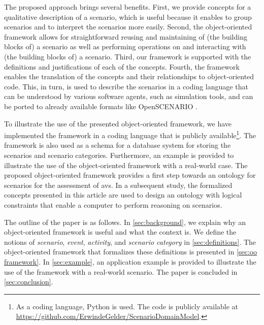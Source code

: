 The proposed approach brings several benefits.
First, we provide concepts for a qualitative description of a scenario, which is useful because it enables to group scenarios and to interpret the scenarios more easily. 
Second, the object-oriented framework allows for straightforward reusing and maintaining of (the building blocks of) a scenario as well as performing operations on and interacting with (the building blocks of) a scenario.
Third, our framework is supported with the definitions and justifications of each of the \cendc\cstartd concepts\cendd\cstartc.
Fourth, the framework enables the translation of the \cendc\cstartd concepts and their relationships \cendd\cstartc to object-oriented code.
This, in turn, is used to describe the scenarios in a coding language that can be understood by various software agents, such as simulation tools\cendc\cstartd, and can be ported to already available formats like OpenSCENARIO \cite{openscenario}. \cendd

\cstartc To illustrate the use of the presented object-oriented framework, we have implemented the framework in a coding language that is publicly available\footnote{As a coding language, Python is used. The code is publicly available at \url{https://github.com/ErwindeGelder/ScenarioDomainModel}.}.
The framework is also used as a schema for a database system for storing the scenarios and scenario categories.
Furthermore, an example is provided to illustrate the use of the object-oriented framework with a real-world case.
The proposed object-oriented framework provides a first step towards an ontology \autocite{siricharoen2009ontology} for scenarios for the assessment of \acp{av}. In a subsequent study, the formalized concepts presented in this article are used to design an ontology with logical constraints that enable a computer to perform reasoning on scenarios.
\cendc

The outline of the paper is as follows. In \cref{sec:background}, we explain why an \cstartb object-oriented framework \cendb is useful and what the context is. 
We define the notions of \emph{scenario}, \emph{event}, \emph{activity}, and \emph{scenario category}  in \cref{sec:definitions}. 
The \cstartb object-oriented framework \cendb that formalizes these definitions is presented in \cref{sec:oo framework}. 
In \cref{sec:example}, an application example is provided to illustrate the use of the \cstartb framework \cendb with a real-world scenario. 
The paper is concluded in \cref{sec:conclusion}.
